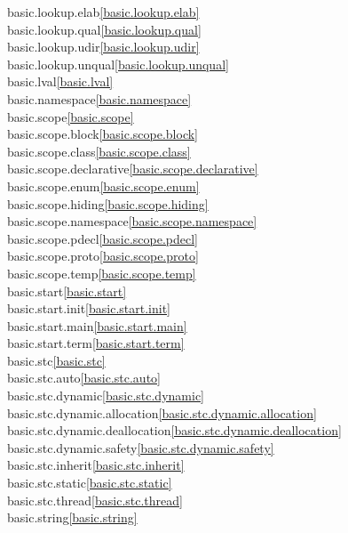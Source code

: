 \begin{multicols}{2}
basic.lookup.elab\quad\ref{basic.lookup.elab}\\
basic.lookup.qual\quad\ref{basic.lookup.qual}\\
basic.lookup.udir\quad\ref{basic.lookup.udir}\\
basic.lookup.unqual\quad\ref{basic.lookup.unqual}\\
basic.lval\quad\ref{basic.lval}\\
basic.namespace\quad\ref{basic.namespace}\\
basic.scope\quad\ref{basic.scope}\\
basic.scope.block\quad\ref{basic.scope.block}\\
basic.scope.class\quad\ref{basic.scope.class}\\
basic.scope.declarative\quad\ref{basic.scope.declarative}\\
basic.scope.enum\quad\ref{basic.scope.enum}\\
basic.scope.hiding\quad\ref{basic.scope.hiding}\\
basic.scope.namespace\quad\ref{basic.scope.namespace}\\
basic.scope.pdecl\quad\ref{basic.scope.pdecl}\\
basic.scope.proto\quad\ref{basic.scope.proto}\\
basic.scope.temp\quad\ref{basic.scope.temp}\\
basic.start\quad\ref{basic.start}\\
basic.start.init\quad\ref{basic.start.init}\\
basic.start.main\quad\ref{basic.start.main}\\
basic.start.term\quad\ref{basic.start.term}\\
basic.stc\quad\ref{basic.stc}\\
basic.stc.auto\quad\ref{basic.stc.auto}\\
basic.stc.dynamic\quad\ref{basic.stc.dynamic}\\
basic.stc.dynamic.allocation\quad\ref{basic.stc.dynamic.allocation}\\
basic.stc.dynamic.deallocation\quad\ref{basic.stc.dynamic.deallocation}\\
basic.stc.dynamic.safety\quad\ref{basic.stc.dynamic.safety}\\
basic.stc.inherit\quad\ref{basic.stc.inherit}\\
basic.stc.static\quad\ref{basic.stc.static}\\
basic.stc.thread\quad\ref{basic.stc.thread}\\
basic.string\quad\ref{basic.string}\\

\end{multicols}
